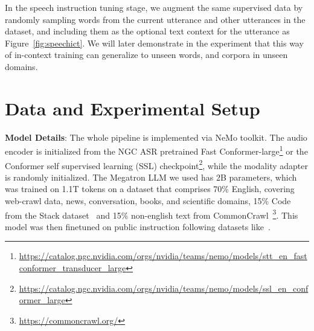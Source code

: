 \documentclass{article}
\begin{document}
In the speech instruction tuning stage, we augment the same supervised data by randomly sampling words from the current utterance and other utterances in the dataset, and including them as the optional text context for the utterance as Figure~\ref{fig:speechict}. We will later demonstrate in the experiment that this way of in-context training can 
generalize to unseen words, and corpora in unseen domains.





\vspace{-0.4em}
\section{Data and Experimental Setup}
\label{sec:setup}
\vspace{-0.4em}

\textbf{Model Details}: 
The whole pipeline is implemented via  NeMo toolkit\cite{kuchaiev2019nemo}.
The audio encoder is initialized from the NGC ASR pretrained Fast Conformer-large\footnote{\scriptsize\url{https://catalog.ngc.nvidia.com/orgs/nvidia/teams/nemo/models/stt_en_fastconformer_transducer_large}}  or the Conformer self supervised learning (SSL) checkpoint\footnote{\scriptsize\url{https://catalog.ngc.nvidia.com/orgs/nvidia/teams/nemo/models/ssl_en_conformer_large}}, while the modality adapter is randomly initialized. 
%
%
The Megatron LLM \cite{shoeybi2019megatron} we used has 2B parameters, 
which was trained on 1.1T tokens on a dataset that comprises 70\% English, covering web-crawl data, news, conversation, books, and scientific domains, 
15\% Code from the Stack dataset~\cite{Kocetkov2022TheStack} and 15\% non-english text from CommonCrawl~\footnote{\scriptsize\url{https://commoncrawl.org/}}. %
This model was then finetuned on public instruction following datasets like~\cite{flandataset}.
\end{document}
